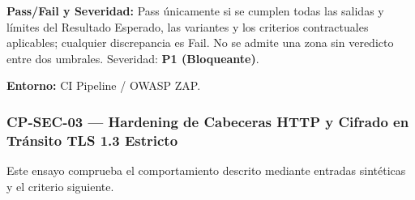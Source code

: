 \par\noindent\textbf{Pass/Fail y Severidad:} Pass únicamente si se cumplen todas las salidas y límites del Resultado Esperado, las variantes y los criterios contractuales aplicables; cualquier discrepancia es Fail. No se admite una zona sin veredicto entre dos umbrales. Severidad: \textbf{P1 (Bloqueante)}.\par
\par\noindent\textbf{Entorno:} CI Pipeline / OWASP ZAP.\par






\subsubsection*{CP-SEC-03 — Hardening de Cabeceras HTTP y Cifrado en Tránsito TLS 1.3 Estricto}\label{sec:9-cp-sec-03}
Este ensayo comprueba el comportamiento descrito mediante entradas sintéticas y el criterio siguiente.

